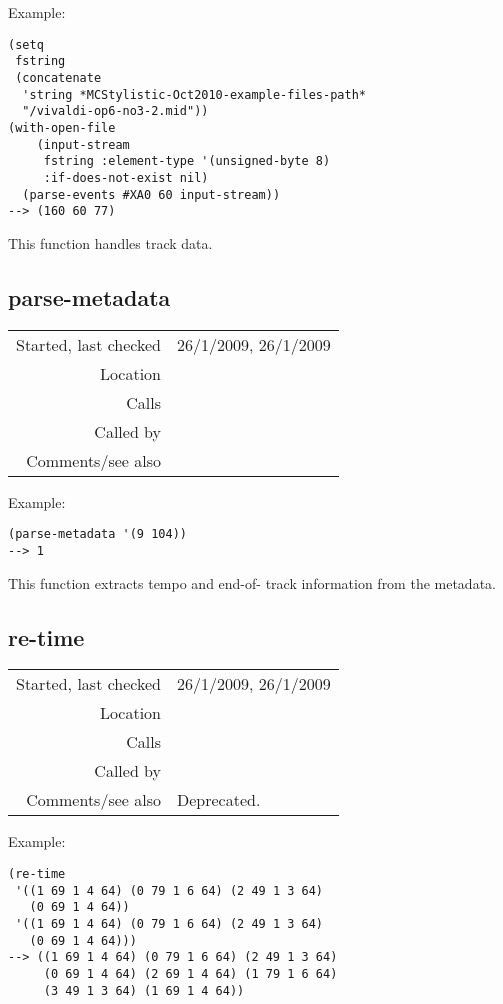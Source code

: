\vspace{0.5cm}
\noindent Example:
\begin{verbatim}
(setq
 fstring
 (concatenate
  'string *MCStylistic-Oct2010-example-files-path*
  "/vivaldi-op6-no3-2.mid"))
(with-open-file
    (input-stream
     fstring :element-type '(unsigned-byte 8)
     :if-does-not-exist nil)
  (parse-events #XA0 60 input-stream))
--> (160 60 77)
\end{verbatim}

\noindent This function handles track data.


\subsection*{parse-metadata}\label{fun:parse-metadata}

\vspace{0.3cm}
\begin{tabular}{r|p{8cm}}
Started, last checked & 26/1/2009, 26/1/2009 \\
Location & \nameref{sec:MIDI-import} \\
Calls & \nameref{fun:list-to-string} \\
Called by & \nameref{fun:parse-events} \\
Comments/see also &
\end{tabular}

\vspace{0.5cm}
\noindent Example:
\begin{verbatim}
(parse-metadata '(9 104))
--> 1
\end{verbatim}

\noindent This function extracts tempo and end-of-
track information from the metadata.


\subsection*{re-time}\label{fun:re-time}

\vspace{0.3cm}
\begin{tabular}{r|p{8cm}}
Started, last checked & 26/1/2009, 26/1/2009 \\
Location & \nameref{sec:MIDI-import} \\
Calls & \nameref{fun:my-last} \\
Called by & \\
Comments/see also & Deprecated.
\end{tabular}

\vspace{0.5cm}
\noindent Example:
\begin{verbatim}
(re-time
 '((1 69 1 4 64) (0 79 1 6 64) (2 49 1 3 64)
   (0 69 1 4 64))
 '((1 69 1 4 64) (0 79 1 6 64) (2 49 1 3 64)
   (0 69 1 4 64)))
--> ((1 69 1 4 64) (0 79 1 6 64) (2 49 1 3 64)
     (0 69 1 4 64) (2 69 1 4 64) (1 79 1 6 64)
     (3 49 1 3 64) (1 69 1 4 64))
\end{verbatim}

